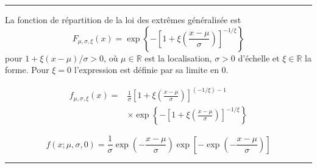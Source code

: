 \begin{f}

\end{f}
\hrule

\begin{f}
La fonction de répartition de la loi des extrêmes généralisée est
\[
F_{\mu,\sigma,\xi}(x) = \exp\left\{-\left[1+\xi\left(\frac{x-\mu}{\sigma}\right)\right]^{-1/\xi}\right\}
\]
pour \(1+\xi(x-\mu)/\sigma>0\), où \(\mu\in\mathbb{R}\) est la localisation, \(\sigma>0\) d'échelle et  \(\xi\in\mathbb{R}\) la forme. Pour \(\xi = 0\) l'expression est définie par sa limite en 0.

\begin{align*}
	f_{\mu,\sigma,\xi}(x) =& \frac{1}{\sigma}\left[1+\xi\left(\frac{x-\mu}{\sigma}\right)\right]^{(-1/\xi)-1}\\ &\times\exp\left\{-\left[1+\xi\left(\frac{x-\mu}{\sigma}\right)\right]^{-1/\xi}\right\}
\end{align*}

\[
f(x;\mu ,\sigma ,0)={\frac {1}{\sigma }}\exp \left(-{\frac {x-\mu }{\sigma }}\right)\exp \left[-\exp \left(-{\frac {x-\mu }{\sigma }}\right)\right]
\]

\end{f}
\hrule



